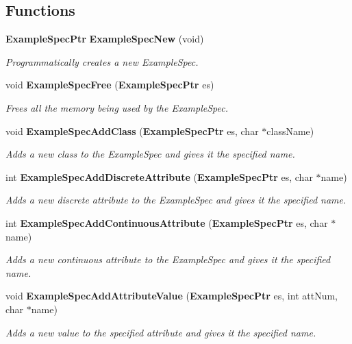 \subsection*{Functions}
\begin{CompactItemize}
\item 
{\bf Example\-Spec\-Ptr} {\bf Example\-Spec\-New} (void)
\begin{CompactList}\small\item\em Programmatically creates a new Example\-Spec. \item\end{CompactList}\item 
void {\bf Example\-Spec\-Free} ({\bf Example\-Spec\-Ptr} es)
\begin{CompactList}\small\item\em Frees all the memory being used by the Example\-Spec. \item\end{CompactList}\item 
void {\bf Example\-Spec\-Add\-Class} ({\bf Example\-Spec\-Ptr} es, char $\ast$class\-Name)
\begin{CompactList}\small\item\em Adds a new class to the Example\-Spec and gives it the specified name. \item\end{CompactList}\item 
int {\bf Example\-Spec\-Add\-Discrete\-Attribute} ({\bf Example\-Spec\-Ptr} es, char $\ast$name)
\begin{CompactList}\small\item\em Adds a new discrete attribute to the Example\-Spec and gives it the specified name. \item\end{CompactList}\item 
int {\bf Example\-Spec\-Add\-Continuous\-Attribute} ({\bf Example\-Spec\-Ptr} es, char $\ast$name)
\begin{CompactList}\small\item\em Adds a new continuous attribute to the Example\-Spec and gives it the specified name. \item\end{CompactList}\item 
void {\bf Example\-Spec\-Add\-Attribute\-Value} ({\bf Example\-Spec\-Ptr} es, int att\-Num, char $\ast$name)
\begin{CompactList}\small\item\em Adds a new value to the specified attribute and gives it the specified name. \item\end{CompactList}\item 

\end{CompactItemize}
